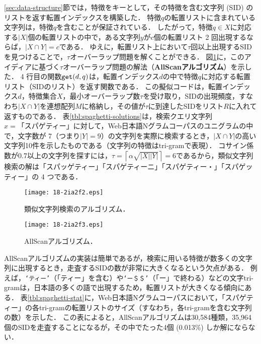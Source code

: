 \documentclass[japanese]{jnlp_JS2.0}
\begin{document}
\ref{sec:data-structure}節では，特徴をキーとして，その特徴を含む文字列 (SID) のリストを返す転置インデックスを構築した．
特徴$q$の転置リストに含まれている文字列は，特徴$q$を含むことが保証されている．
したがって，特徴$q \in X$に対応する$|X|$個の転置リストの中で，ある文字列$y$が$c$個の転置リスト 2 回出現するならば，$|X \cap Y| = c$である．
ゆえに，転置リスト上において$\tau$回以上出現するSIDを見つけることで，$\tau$オーバーラップ問題を解くことができる．
図\ref{alg:t-overlap-naive}に，このアイディアに基づく$\tau$オーバーラップ問題の解法（{\bf AllScanアルゴリズム}）を示した．
4 行目の関数$\mbox{\tt get}(d, q)$は，転置インデックス$d$の中で特徴$q$に対応する転置リスト（SIDのリスト）を返す関数である．
この擬似コードは，転置インデックス$d$，特徴集合$X$，最小オーバーラップ数$\tau$を受け取り，SIDの出現頻度，すなわち$|X \cap Y|$を連想配列$M$に格納し，その値が$\tau$に到達したSIDをリスト$R$に入れて返すものである．
表\ref{tbl:spaghetti-solutions}は，検索クエリ文字列$x = \mbox{「スパゲティー」}$に対して，Web日本語Nグラムコーパスのユニグラムの中で，文字数が 7（つまり$|Y| = 9$）の文字列を実際に検索するとき，$|X \cap Y|$の高い文字列10件を示したものである（文字列の特徴はtri-gramで表現）．
コサイン係数が0.7以上の文字列を探すには，$\tau = \left\lceil \alpha \sqrt{|X||Y|} \right\rceil = 6$であるから，類似文字列検索の解は「スパッゲティー」「スパゲティーニ」「スパゲティー・」「スパゲッティー」の 4 つである．

\begin{figure}[t]
\begin{minipage}{0.45\textwidth}
\begin{center}
\texttt{[image: 18-2ia2f2.eps]}
\end{center}
\caption{類似文字列検索のアルゴリズム．}
\label{alg:approximate-string-matching}
\vspace{22pt}
\end{minipage}
\hfill
\begin{minipage}{0.45\textwidth}
\begin{center}
\texttt{[image: 18-2ia2f3.eps]}
\end{center}
\caption{AllScanアルゴリズム．}
\label{alg:t-overlap-naive}
\end{minipage}
\end{figure}


AllScanアルゴリズムの実装は簡単であるが，検索に用いる特徴が数多くの文字列に出現するとき，走査するSIDの数が非常に大きくなるという欠点がある．
例えば，\texttt{`ティー'}（「ティー」を含む）や\texttt{`ー＄＄'}（「ー」で終わる）などの文字tri-gramは，日本語の多くの語で出現するため，転置リストが大きくなる傾向にある．
表\ref{tbl:spaghetti-stat}に，Web日本語Nグラムコーパスにおいて，「スパゲティー」の各tri-gramの転置リストのサイズ（すなわち，各tri-gramを含む文字列の数）を示した．
この表によると，AllScanアルゴリズムは30,584種類，35,964個のSIDを走査することになるが，その中でたった4個 (0.013\%) しか解にならない．
\end{document}
